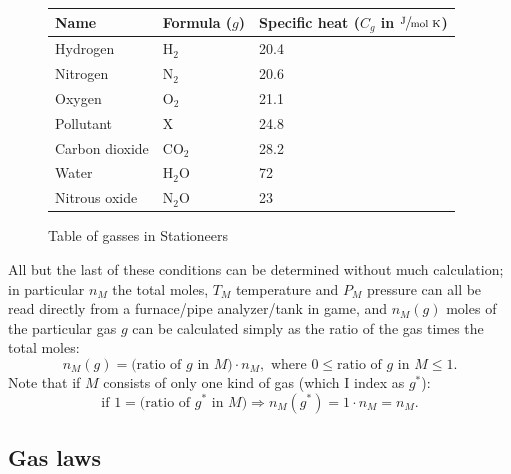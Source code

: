 \documentclass{article}
\newcommand{\Hyd}{\mathrm{H}_2}
\newcommand{\Nit}{\mathrm{N}_2}
\newcommand{\Ox}{\mathrm{O}_2}
\newcommand{\Pol}{\mathrm{X}}
\newcommand{\CDiox}{\mathrm{CO}_2}
\newcommand{\Water}{\mathrm{H}_2\mathrm{O}}
\newcommand{\NiOx}{\mathrm{N}_2\mathrm{O}}
\begin{document}
\begin{figure}
    \begin{center}
        \begin{tabular}{*3l}
            \toprule
            Name & Formula ($g$) & Specific heat ($C_g$ in $\sfrac{\text{J}}{\text{mol K}}$) \\
            \midrule
            Hydrogen & $\Hyd$ & 20.4 \\
            Nitrogen & $\Nit$ & 20.6 \\
            Oxygen & $\Ox$ & 21.1 \\
            Pollutant & $\Pol$ & 24.8 \\
            Carbon dioxide & $\CDiox$ & 28.2 \\
            Water & $\Water$ & 72 \\
            Nitrous oxide & $\NiOx$ & 23 \\
            \bottomrule
        \end{tabular}
    \end{center}
    \caption{Table of gasses in Stationeers}
    \label{fig:gas-table}
\end{figure}

All but the last of these conditions can be determined without much calculation; in particular $n_M$
the total moles, $T_M$ temperature and $P_M$ pressure can all be read directly from a furnace/pipe
analyzer/tank in game, and $n_M(g)$ moles of the particular gas $g$ can be calculated simply as the
ratio of the gas times the total moles:
\[
    n_M(g) = \text{(ratio of $g$ in $M$)}\cdot n_M,
    \text{ where } 0 \le \text{ratio of $g$ in $M$} \le 1.
\]
Note that if $M$ consists of only one kind of gas (which I index as $g^*$):
\[
    \text{if } 1 = \text{(ratio of $g^*$ in $M$)}
    \Rightarrow
    n_M(g^*) = 1\cdot n_M = n_M.
\]

\subsection{Gas laws}
\end{document}
